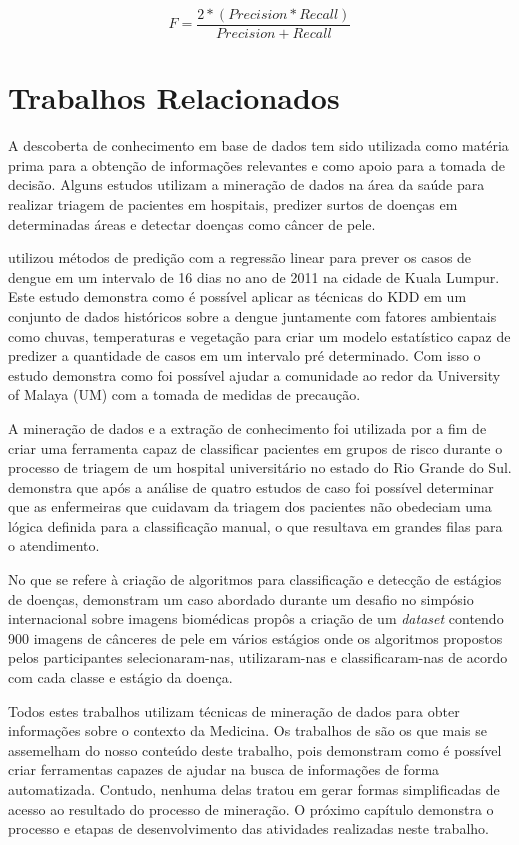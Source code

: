 \begin{equation}
F  = \frac{2 * (Precision * Recall)}{Precision + Recall}
\end{equation}


\section{Trabalhos Relacionados}

A descoberta de conhecimento em base de dados tem sido utilizada como matéria prima para a obtenção de informações relevantes e como apoio para a tomada de decisão. Alguns estudos utilizam a mineração de dados na área da saúde para realizar triagem de pacientes em hospitais, predizer surtos de doenças em determinadas áreas e detectar doenças como câncer de pele.

 utilizou métodos de predição com a regressão linear para prever os casos de dengue em um intervalo de 16 dias no ano de 2011 na cidade de Kuala Lumpur. Este estudo demonstra como é possível aplicar as técnicas do KDD em um conjunto de dados históricos sobre a dengue juntamente com fatores ambientais como chuvas, temperaturas e vegetação para criar um modelo estatístico capaz de predizer a quantidade de casos em um intervalo pré determinado. Com isso o estudo demonstra como foi possível ajudar a comunidade ao redor da University of Malaya (UM) com a tomada de medidas de precaução.

A mineração de dados e a extração de conhecimento foi utilizada por  a fim de criar uma ferramenta capaz de classificar pacientes em grupos de risco durante o processo de triagem de um hospital universitário no estado do Rio Grande do Sul.  demonstra que após a análise de quatro estudos de caso foi possível determinar que as enfermeiras que cuidavam da triagem dos pacientes não obedeciam uma lógica definida para a classificação manual, o que resultava em grandes filas para o atendimento.

No que se refere à criação de algoritmos para classificação e detecção de estágios de doenças,  demonstram um caso abordado durante um desafio no simpósio internacional sobre imagens biomédicas propôs a criação de um \textit{dataset} contendo 900 imagens de cânceres de pele em vários estágios onde os algoritmos propostos pelos participantes selecionaram-nas, utilizaram-nas e classificaram-nas de acordo com cada classe e estágio da doença.

Todos estes trabalhos utilizam técnicas de mineração de dados para obter informações sobre o contexto da Medicina. Os trabalhos de  são os que mais se assemelham do nosso conteúdo deste trabalho, pois demonstram como é possível criar ferramentas capazes de ajudar na busca de informações de forma automatizada. Contudo, nenhuma delas tratou em gerar formas simplificadas de acesso ao resultado do processo de mineração. O próximo capítulo demonstra o processo e etapas de desenvolvimento das atividades realizadas neste trabalho.